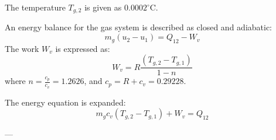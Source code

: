 The temperature \( T_{g,2} \) is given as \( 0.0002^\circ\text{C} \).  

An energy balance for the gas system is described as closed and adiabatic:  
\[
m_g (u_2 - u_1) = Q_{12} - W_v
\]  
The work \( W_v \) is expressed as:  
\[
W_v = R \frac{(T_{g,2} - T_{g,1})}{1 - n}
\]  
where \( n = \frac{c_p}{c_v} = 1.2626 \), and \( c_p = R + c_v = 0.29228 \).  

The energy equation is expanded:  
\[
m_g c_v (T_{g,2} - T_{g,1}) + W_v = Q_{12}
\]  

---